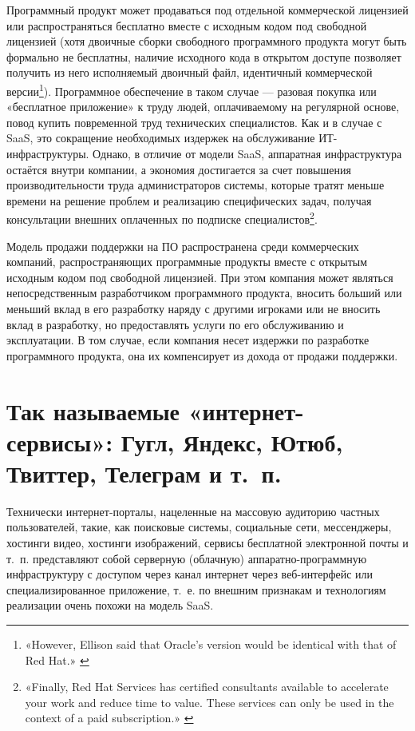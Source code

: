 \documentclass{article}
\begin{document}
Программный продукт может продаваться под отдельной коммерческой лицензией или распространяться бесплатно вместе с исходным кодом под свободной лицензией (хотя двоичные сборки свободного программного продукта могут быть формально не бесплатны, наличие исходного кода в открытом доступе позволяет получить из него исполняемый двоичный файл, идентичный коммерческой версии\footnote{«However, Ellison said that Oracle’s version would be identical with that of Red Hat.» \cite{oracleMovesToRedhat}}). Программное обеспечение в таком случае — разовая покупка или «бесплатное приложение» к труду людей, оплачиваемому на регулярной основе, повод купить повременной труд технических специалистов. Как и в случае с SaaS, это сокращение необходимых издержек на обслуживание ИТ-инфраструктуры. Однако, в отличие от модели SaaS, аппаратная инфраструктура остаётся внутри компании, а экономия достигается за счет повышения производительности труда администраторов системы, которые тратят меньше времени на решение проблем и реализацию специфических задач, получая консультации внешних оплаченных по подписке специалистов\footnote{«Finally, Red Hat Services has certified consultants available to accelerate your work and reduce time to value. These services can only be used in the context of a paid subscription.» \cite{redhatSubscriptionGuide}}.

Модель продажи поддержки на ПО распространена среди коммерческих компаний, распространяющих программные продукты вместе с открытым исходным кодом под свободной лицензией. При этом компания может являться непосредственным разработчиком программного продукта, вносить больший или меньший вклад в его разработку наряду с другими игроками или не вносить вклад в разработку, но предоставлять услуги по его обслуживанию и эксплуатации. В том случае, если компания несет издержки по разработке программного продукта, она их компенсирует из дохода от продажи поддержки.

\section*{Так называемые «интернет-сервисы»: Гугл, Яндекс, Ютюб, Твиттер, Телеграм и т.~п.}

Технически интернет-порталы, нацеленные на массовую аудиторию частных пользователей, такие, как поисковые системы, социальные сети, мессенджеры, хостинги видео, хостинги изображений, сервисы бесплатной электронной почты и т.~п. представляют собой серверную (облачную) аппаратно-программную инфраструктуру с доступом через канал интернет через веб-интерфейс или специализированное приложение, т.~е. по внешним признакам и технологиям реализации очень похожи на модель SaaS.
\end{document}
